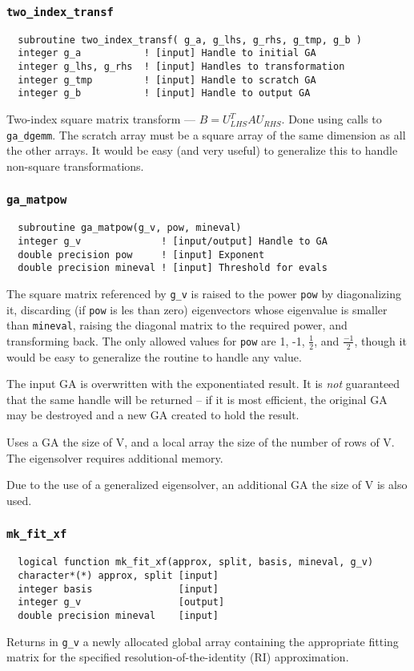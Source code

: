 \subsubsection{{\tt two\_index\_transf}}
\begin{verbatim}
  subroutine two_index_transf( g_a, g_lhs, g_rhs, g_tmp, g_b )
  integer g_a           ! [input] Handle to initial GA
  integer g_lhs, g_rhs  ! [input] Handles to transformation
  integer g_tmp         ! [input] Handle to scratch GA
  integer g_b           ! [input] Handle to output GA
\end{verbatim}
Two-index square matrix transform --- $B = U_{LHS}^T A U_{RHS}$.  Done
using calls to \verb+ga_dgemm+.  The scratch array must be a square
array of the same dimension as all the other arrays.  It would be easy
(and very useful) to generalize this to handle non-square transformations.

\subsubsection{{\tt ga\_matpow}}
\begin{verbatim}
  subroutine ga_matpow(g_v, pow, mineval)
  integer g_v              ! [input/output] Handle to GA
  double precision pow     ! [input] Exponent
  double precision mineval ! [input] Threshold for evals
\end{verbatim}
The square matrix referenced by \verb+g_v+ is raised to the power
\verb+pow+ by diagonalizing it, discarding (if \verb+pow+ is les than
zero) eigenvectors whose eigenvalue is smaller than \verb+mineval+,
raising the diagonal matrix to the required power, and transforming
back.  The only allowed values for \verb+pow+ are 1, -1,
$\frac{1}{2}$, and $\frac{-1}{2}$, though it would be easy to
generalize the routine to handle any value.

The input GA is overwritten with the exponentiated result.  It is {\em
not} guaranteed that the same handle will be returned -- if it is most
efficient, the original GA may be destroyed and a new GA created to
hold the result.

Uses a GA the size of V, and a local array the size of the number
of rows of V.  The eigensolver requires additional memory.

Due to the use of a generalized eigensolver, an additional GA the size
of V is also used.

\subsubsection{{\tt mk\_fit\_xf}}
\begin{verbatim}
  logical function mk_fit_xf(approx, split, basis, mineval, g_v)
  character*(*) approx, split [input]
  integer basis               [input]
  integer g_v                 [output]
  double precision mineval    [input]
\end{verbatim}
Returns in \verb+g_v+ a newly allocated global array containing the
appropriate fitting matrix for the specified
resolution-of-the-identity (RI) approximation.

